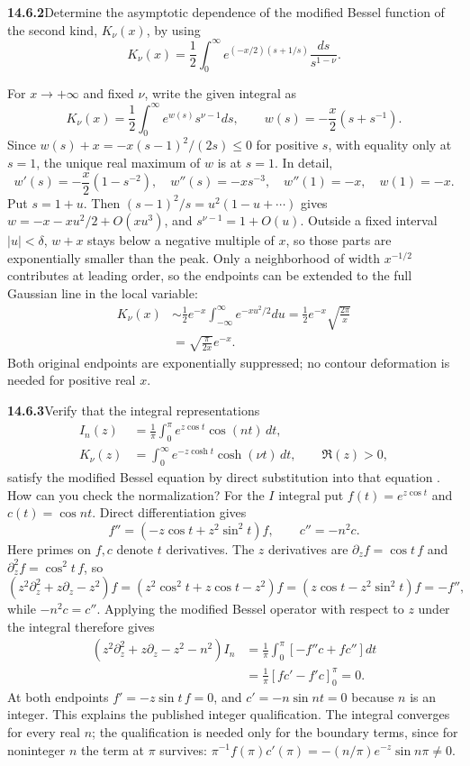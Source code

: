 \par\bigskip
\noindent\textbf{14.6.2}\quad Determine the asymptotic dependence of
the modified Bessel function of the second kind, $K_{\nu}(x)$, by using
\[
K_{\nu}(x)=\frac{1}{2}\int_{0}^{\infty}
e^{(-x/2)(s+1/s)}\frac{ds}{s^{1-\nu}}.
\]
\par{}
\solution
For $x\to+\infty$ and fixed $\nu$, write the given integral as
\[
K_\nu(x)=\frac12\int_0^\infty e^{w(s)}s^{\nu-1}ds,
\qquad w(s)=-\frac x2(s+s^{-1}).
\]
Since $w(s)+x=-x(s-1)^2/(2s)\le0$ for positive $s$, with
equality only at $s=1$, the unique real maximum of $w$ is at
$s=1$. In detail,
\[
w'(s)=-\frac x2(1-s^{-2}),\quad w''(s)=-xs^{-3},\quad
w''(1)=-x,\quad w(1)=-x.
\]
Put $s=1+u$. Then $(s-1)^2/s=u^2(1-u+\cdots)$ gives
$w=-x-xu^2/2+O(xu^3)$, and $s^{\nu-1}=1+O(u)$.
Outside a fixed interval $|u|<\delta$, $w+x$ stays below a negative
multiple of $x$, so those parts are exponentially smaller than the
peak. Only a neighborhood of width $x^{-1/2}$ contributes at leading
order, so the endpoints can be extended to the full Gaussian
line in the local variable:
\begin{align*}
K_\nu(x)&\sim\frac12e^{-x}
\int_{-\infty}^{\infty}e^{-xu^2/2}du
=\frac12e^{-x}\sqrt{\frac{2\pi}{x}}\\
&=\boxed{\sqrt{\frac\pi{2x}}e^{-x}}.
\end{align*}
Both original endpoints are exponentially suppressed; no contour
deformation is needed for positive real $x$.

\par\bigskip
\noindent\textbf{14.6.3}\quad Verify that the integral representations
\begin{align*}
I_{n}(z)&=\frac{1}{\pi}\int_{0}^{\pi}e^{z\cos t}\cos(nt)\,dt,\\
K_{\nu}(z)&=\int_{0}^{\infty}e^{-z\cosh t}\cosh(\nu t)\,dt,
\qquad\Re(z)>0,
\end{align*}
satisfy the modified Bessel equation by direct substitution into that
equation . How can you check
the normalization?
\solution
For the $I$ integral put $f(t)=e^{z\cos t}$ and
$c(t)=\cos nt$. Direct differentiation gives
\[
f''=(-z\cos t+z^2\sin^2t)f,
\qquad c''=-n^2c.
\]
Here primes on $f,c$ denote $t$ derivatives. The $z$ derivatives
are $\partial_zf=\cos t\,f$ and $\partial_z^2f=\cos^2t\,f$, so
\[
(z^2\partial_z^2+z\partial_z-z^2)f
=(z^2\cos^2t+z\cos t-z^2)f=(z\cos t-z^2\sin^2t)f=-f'',
\]
while $-n^2c=c''$. Applying the
modified Bessel operator with respect to $z$ under the integral
therefore gives
\begin{align*}
(z^2\partial_z^2+z\partial_z-z^2-n^2)I_n
&=\frac1\pi\int_0^\pi[-f''c+fc'']dt\\
&=\frac1\pi[fc'-f'c]_0^\pi=0.
\end{align*}
At both endpoints $f'=-z\sin t\,f=0$, and $c'=-n\sin nt=0$
because $n$ is an integer. This explains the published integer
qualification. The integral converges for every real $n$; the
qualification is needed only for the boundary terms, since for
noninteger $n$ the term at $\pi$ survives:
$\pi^{-1}f(\pi)c'(\pi)=-(n/\pi)e^{-z}\sin n\pi\ne0$.

